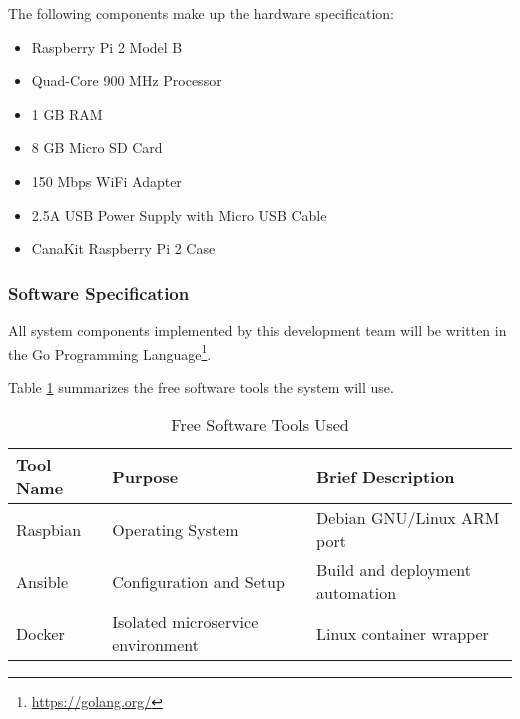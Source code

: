 The following components make up the hardware specification:

\begin{itemize}
    \item Raspberry Pi 2 Model B
    \item Quad-Core 900 MHz Processor
    \item 1 GB RAM
    \item 8 GB Micro SD Card
    \item 150 Mbps WiFi Adapter
    \item 2.5A USB Power Supply with Micro USB Cable
    \item CanaKit Raspberry Pi 2 Case
\end{itemize}

\subsubsection{Software Specification}

All system components implemented by this development team will be written
in the Go Programming Language\footnote{\url{https://golang.org/}}.

Table \ref{table:tools} summarizes the free software tools the system will use.

\begin{table}[h]
\centering
\begin{tabular}{l l l}
Tool Name & Purpose & Brief Description \\
\hline
Raspbian\tablefootnote{\url{https://www.raspbian.org/}} & Operating System & Debian GNU/Linux ARM port \\
Ansible\tablefootnote{\url{http://www.ansible.com/}} & Configuration and Setup & Build and deployment automation \\
Docker\tablefootnote{\url{https://www.docker.com/}} & Isolated microservice environment & Linux container wrapper \\
\end{tabular}
\caption{Free Software Tools Used}
\label{table:tools}
\end{table}
